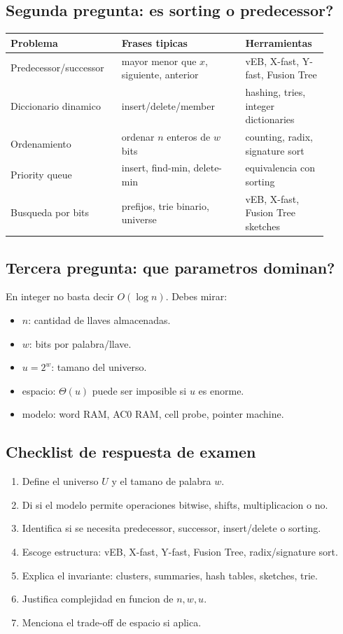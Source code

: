 \documentclass[10pt]{article}
\newcommand{\bigO}{O}
\begin{document}
\subsection{Segunda pregunta: es sorting o predecessor?}
\begin{center}
\begin{tabular}{p{0.30\linewidth}p{0.36\linewidth}p{0.24\linewidth}}
\toprule
Problema & Frases tipicas & Herramientas \\
\midrule
Predecessor/successor & mayor menor que $x$, siguiente, anterior & vEB, X-fast, Y-fast, Fusion Tree \\
Diccionario dinamico & insert/delete/member & hashing, tries, integer dictionaries \\
Ordenamiento & ordenar $n$ enteros de $w$ bits & counting, radix, signature sort \\
Priority queue & insert, find-min, delete-min & equivalencia con sorting \\
Busqueda por bits & prefijos, trie binario, universe & vEB, X-fast, Fusion Tree sketches \\
\bottomrule
\end{tabular}
\end{center}

\subsection{Tercera pregunta: que parametros dominan?}
En integer no basta decir $\bigO(\log n)$. Debes mirar:
\begin{itemize}[leftmargin=*]
\item $n$: cantidad de llaves almacenadas.
\item $w$: bits por palabra/llave.
\item $u=2^w$: tamano del universo.
\item espacio: $\Theta(u)$ puede ser imposible si $u$ es enorme.
\item modelo: word RAM, AC0 RAM, cell probe, pointer machine.
\end{itemize}

\subsection{Checklist de respuesta de examen}
\begin{enumerate}[leftmargin=*]
\item Define el universo $U$ y el tamano de palabra $w$.
\item Di si el modelo permite operaciones bitwise, shifts, multiplicacion o no.
\item Identifica si se necesita predecessor, successor, insert/delete o sorting.
\item Escoge estructura: vEB, X-fast, Y-fast, Fusion Tree, radix/signature sort.
\item Explica el invariante: clusters, summaries, hash tables, sketches, trie.
\item Justifica complejidad en funcion de $n,w,u$.
\item Menciona el trade-off de espacio si aplica.
\end{enumerate}
\end{document}
